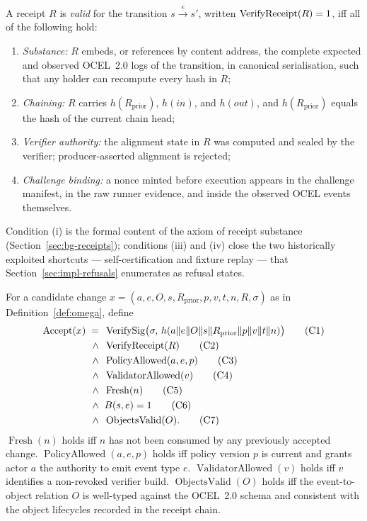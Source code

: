 \begin{definition}
\label{def:valid-receipt}
A receipt $R$ is \emph{valid} for the transition $s \xrightarrow{e} s'$,
written $\operatorname{VerifyReceipt}(R) = 1$, iff all of the following hold:
\begin{enumerate}[label=(\roman*),leftmargin=2.4em,noitemsep]
  \item \emph{Substance:} $R$ embeds, or references by content address, the
        complete expected and observed OCEL~2.0 logs of the transition, in
        canonical serialisation, such that any holder can recompute every hash
        in $R$;
  \item \emph{Chaining:} $R$ carries $h(R_{\mathrm{prior}})$,
        $h(\textit{in})$, and $h(\textit{out})$, and $h(R_{\mathrm{prior}})$
        equals the hash of the current chain head;
  \item \emph{Verifier authority:} the alignment state in $R$ was computed and
        sealed by the verifier; producer-asserted alignment is rejected;
  \item \emph{Challenge binding:} a nonce minted before execution appears in
        the challenge manifest, in the raw runner evidence, and inside the
        observed OCEL events themselves.
\end{enumerate}
\end{definition}

Condition (i) is the formal content of the axiom of receipt substance
(Section~\ref{sec:bg-receipts}); conditions (iii) and (iv) close the two
historically exploited shortcuts --- self-certification and fixture replay ---
that Section~\ref{sec:impl-refusals} enumerates as refusal states.

\begin{definition}
\label{def:accept}
For a candidate change
$x = (a, e, O, s, R_{\mathrm{prior}}, p, v, t, n, R, \sigma)$ as in
Definition~\ref{def:omega}, define
\begin{align}
  \operatorname{Accept}(x) \;=\;\;
  &\operatorname{VerifySig}\bigl(\sigma,\, h(a \| e \| O \| s \| R_{\mathrm{prior}} \| p \| v \| t \| n)\bigr) \tag{C1}\\
  \wedge\;\; &\operatorname{VerifyReceipt}(R) \tag{C2}\\
  \wedge\;\; &\operatorname{PolicyAllowed}(a, e, p) \tag{C3}\\
  \wedge\;\; &\operatorname{ValidatorAllowed}(v) \tag{C4}\\
  \wedge\;\; &\operatorname{Fresh}(n) \tag{C5}\\
  \wedge\;\; &B(s, e) = 1 \tag{C6}\\
  \wedge\;\; &\operatorname{ObjectsValid}(O). \tag{C7}
\end{align}
$\operatorname{Fresh}(n)$ holds iff $n$ has not been consumed by any previously
accepted change. $\operatorname{PolicyAllowed}(a,e,p)$ holds iff policy version
$p$ is current and grants actor $a$ the authority to emit event type $e$.
$\operatorname{ValidatorAllowed}(v)$ holds iff $v$ identifies a non-revoked
verifier build. $\operatorname{ObjectsValid}(O)$ holds iff the event-to-object
relation $O$ is well-typed against the OCEL~2.0 schema and consistent with the
object lifecycles recorded in the receipt chain.
\end{definition}

